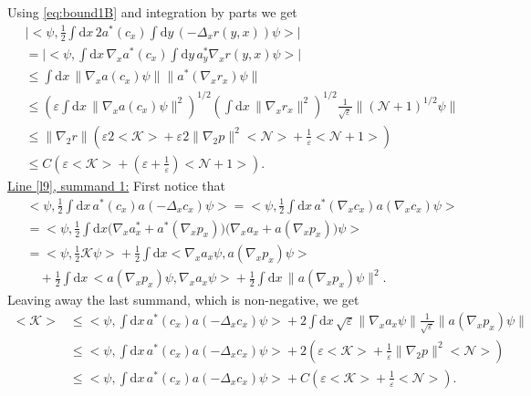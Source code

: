\documentclass[11pt,a4paper,draft,DIV11]{scrartcl}	%
\newcommand{\di}{\textrm{d}}		%
\newcommand{\Ncal}{\mathcal{N}}		%
\newcommand{\Kcal}{\mathcal{K}}		%
\newcommand{\estlist}[2]{\underline{Line \ref{l#1}, summand #2:}}
\newcommand{\scal}[2]{\big<#1,#2\big>} %
\newcommand{\norm}[1]{\lVert#1\rVert}	%
\newcommand{\ev}[1]{\big<#1\big>}	%
\newcommand{\gradone}{\nabla_2}
\begin{document}
Using \eqref{eq:bound1B} and integration by parts we get
\begin{align*}
& \lvert \scal{\psi}{\frac{1}{2}\int \di x\, 2a^\ast(c_x) \int \di y\, (-\Delta_x r(y,x))\psi} \rvert \\
& = \lvert \scal{\psi}{\int \di x\, \nabla_x a^\ast(c_x) \int \di y\, a^\ast_y \nabla_x r(y,x) \psi}\rvert \\
& \leq \int \di x\, \norm{\nabla_x a(c_x)\psi} \norm{a^\ast(\nabla_x r_x)\psi} \\
& \leq \left( \varepsilon \int \di x\, \norm{\nabla_x a(c_x) \psi}^2 \right)^{1/2} \left( \int \di x\, \norm{\nabla_x r_x}^2 \right)^{1/2} \frac{1}{\sqrt{\varepsilon}} \norm{(\Ncal+1)^{1/2}\psi} \\
& \leq \norm{\gradone r} \left( \varepsilon 2\ev{\Kcal} + \varepsilon 2 \norm{\gradone p}^2 \ev{\Ncal} + \frac{1}{\varepsilon}\ev{\Ncal+1} \right) \\
& \leq C \left( \varepsilon \ev{\Kcal} + (\varepsilon+\frac{1}{\varepsilon})\ev{\Ncal+1} \right).
\end{align*}
\estlist{9}{1}
First notice that
\begin{align*}
 & \scal{\psi}{\frac{1}{2}\int \di x\, a^\ast(c_x) a(-\Delta_x c_x)\psi} = \scal{\psi}{\frac{1}{2}\int \di x\, a^\ast(\nabla_x c_x)a(\nabla_x c_x)\psi} \\
& = \scal{\psi}{\frac{1}{2}\int \di x \big( \nabla_x a^\ast_x + a^\ast(\nabla_x p_x) \big)\big(  \nabla_x a_x + a(\nabla_x p_x) \big) \psi} \\
& = \scal{\psi}{\frac{1}{2}\Kcal \psi} + \frac{1}{2}\int \di x\scal{\nabla_x
a_x \psi}{a(\nabla_x p_x)\psi} \\
& \quad + \frac{1}{2}\int \di x\, \scal{a(\nabla_x p_x)\psi}{\nabla_x a_x \psi} + \frac{1}{2}\int \di x\, \norm{a(\nabla_x p_x)\psi}^2.
\end{align*}
Leaving away the last summand, which is non-negative, we get
\begin{equation}
\label{eq:bound1A}
\begin{split}
 \ev{\Kcal} & \leq \scal{\psi}{\int \di x\, a^\ast(c_x) a(-\Delta_x c_x)\psi} + 2\int \di x\, \sqrt{\varepsilon} \norm{\nabla_x a_x \psi} \frac{1}{\sqrt{\varepsilon}} \norm{a(\nabla_x p_x)\psi} \\
& \leq \scal{\psi}{\int \di x\, a^\ast(c_x) a(-\Delta_x c_x)\psi} + 2\left( \varepsilon \ev{\Kcal} + \frac{1}{\varepsilon}  \norm{\gradone p}^2 \ev{\Ncal}\right) \\
& \leq \scal{\psi}{\int \di x\,a^\ast(c_x) a(-\Delta_x c_x)\psi} + C\left( \varepsilon \ev{\Kcal} + \frac{1}{\varepsilon}\ev{\Ncal} \right).
\end{split}
\end{equation}
\end{document}
